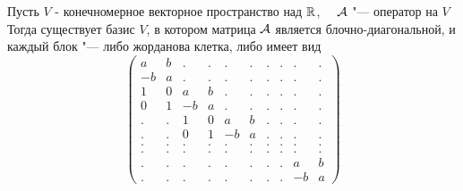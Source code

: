 \begin{theorem}
	Пусть $ V $ - конечномерное векторное пространство над $ \mathbb{R} $, $ \quad \mathcal{A} $ "--- оператор на $ V $ \\
	Тогда существует базис $ V $, в котором матрица $ \mathcal{A} $ является блочно-диагональной, и каждый блок "--- либо жорданова клетка, либо имеет вид
	$$
	\begin{pmatrix}
		a & b & . & . & . & . & . & . & . & . \\
		-b & a & . & . & . & . & . & . & . & . \\
		1 & 0 & a & b & . & . & . & . & . & . \\
		0 & 1 & -b & a & . & . & . & . & . & . \\
		. & . & 1 & 0 & a & b & . & . & . & . \\
		. & . & 0 & 1 & -b & a & . & . & . & . \\
		. & . & . & . & . & . & . & . & . & . \\
		. & . & . & . & . & . & . & . & . & . \\
		. & . & . & . & . & . & . & . & a & b \\
		. & . & . & . & . & . & . & . & -b & a
	\end{pmatrix} $$
\end{theorem}

